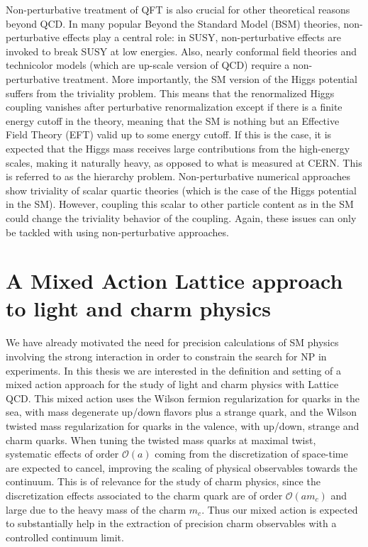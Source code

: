 Non-perturbative treatment of QFT is also crucial for other theoretical reasons beyond QCD. In many popular Beyond the Standard Model (BSM) theories, non-perturbative effects play a central role: in SUSY, non-perturbative effects are invoked to break SUSY at low energies. Also, nearly conformal field theories and technicolor models (which are up-scale version of QCD) require a non-perturbative treatment. More importantly, the SM version of the Higgs potential suffers from the triviality problem. This means that the renormalized Higgs coupling vanishes after perturbative renormalization except if there is a finite energy cutoff in the theory, meaning that the SM is nothing but an Effective Field Theory (EFT) valid up to some energy cutoff. If this is the case, it is expected that the Higgs mass receives large contributions from the high-energy scales, making it naturally heavy, as opposed to what is measured at CERN. This is referred to as the hierarchy problem. Non-perturbative numerical approaches show triviality of scalar quartic theories (which is the case of the Higgs potential in the SM). However, coupling this scalar to other particle content as in the SM could change the triviality behavior of the coupling. Again, these issues can only be tackled with using non-perturbative approaches.

\section*{A Mixed Action Lattice approach to light and charm physics}

We have already motivated the need for precision calculations of SM physics involving the strong interaction in order to constrain the search for NP in experiments. In this thesis we are interested in the definition and setting of a mixed action approach for the study of light and charm physics with Lattice QCD. This mixed action uses the Wilson fermion regularization for quarks in the sea, with mass degenerate up/down flavors plus a strange quark, and the Wilson twisted mass regularization for quarks in the valence, with up/down, strange and charm quarks. When tuning the twisted mass quarks at maximal twist, systematic effects of order $\mathcal{O}(a)$ coming from the discretization of space-time are expected to cancel, improving the scaling of physical observables towards the continuum. This is of relevance for the study of charm physics, since the discretization effects associated to the charm quark are of order $\mathcal{O}(am_c)$ and large due to the heavy mass of the charm $m_c$. Thus our mixed action is expected to substantially help in the extraction of precision charm observables with a controlled continuum limit.

